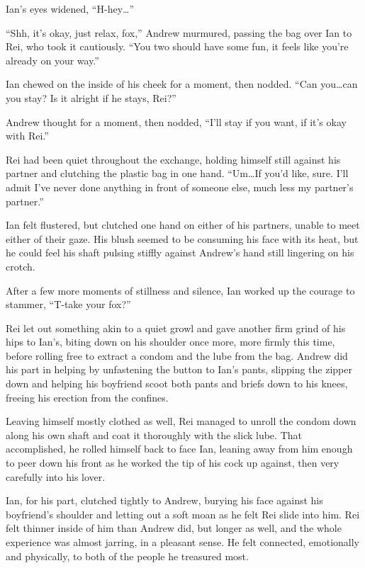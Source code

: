 Ian's eyes widened, ``H-hey\ldots{}''

``Shh, it's okay, just relax, fox,'' Andrew murmured, passing the bag over Ian to Rei, who took it cautiously. ``You two should have some fun, it feels like you're already on your way.''

Ian chewed on the inside of his cheek for a moment, then nodded. ``Can you\ldots{}can you stay? Is it alright if he stays, Rei?''

Andrew thought for a moment, then nodded, ``I'll stay if you want, if it's okay with Rei.''

Rei had been quiet throughout the exchange, holding himself still against his partner and clutching the plastic bag in one hand. ``Um\ldots{}If you'd like, sure. I'll admit I've never done anything in front of someone else, much less my partner's partner.''

Ian felt flustered, but clutched one hand on either of his partners, unable to meet either of their gaze. His blush seemed to be consuming his face with its heat, but he could feel his shaft pulsing stiffly against Andrew's hand still lingering on his crotch.

After a few more moments of stillness and silence, Ian worked up the courage to stammer, ``T-take your fox?''

Rei let out something akin to a quiet growl and gave another firm grind of his hips to Ian's, biting down on his shoulder once more, more firmly this time, before rolling free to extract a condom and the lube from the bag. Andrew did his part in helping by unfastening the button to Ian's pants, slipping the zipper down and helping his boyfriend scoot both pants and briefs down to his knees, freeing his erection from the confines.

Leaving himself mostly clothed as well, Rei managed to unroll the condom down along his own shaft and coat it thoroughly with the slick lube. That accomplished, he rolled himself back to face Ian, leaning away from him enough to peer down his front as he worked the tip of his cock up against, then very carefully into his lover.

Ian, for his part, clutched tightly to Andrew, burying his face against his boyfriend's shoulder and letting out a soft moan as he felt Rei slide into him. Rei felt thinner inside of him than Andrew did, but longer as well, and the whole experience was almost jarring, in a pleasant sense. He felt connected, emotionally and physically, to both of the people he treasured most.

